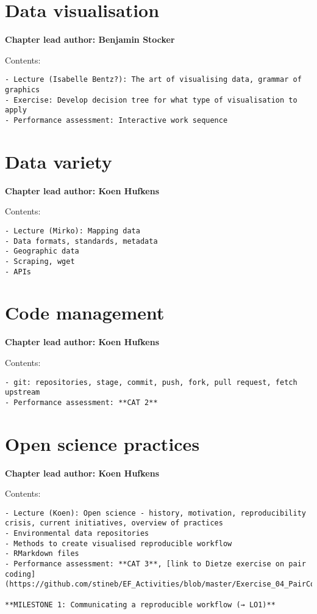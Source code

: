 \documentclass[
]{book}
\begin{document}
\hypertarget{data_vis}{%
\chapter{Data visualisation}\label{data_vis}}

\textbf{Chapter lead author: Benjamin Stocker}

Contents:

\begin{verbatim}
- Lecture (Isabelle Bentz?): The art of visualising data, grammar of graphics
- Exercise: Develop decision tree for what type of visualisation to apply
- Performance assessment: Interactive work sequence
\end{verbatim}

\hypertarget{data_variety}{%
\chapter{Data variety}\label{data_variety}}

\textbf{Chapter lead author: Koen Hufkens}

Contents:

\begin{verbatim}
- Lecture (Mirko): Mapping data
- Data formats, standards, metadata
- Geographic data
- Scraping, wget
- APIs
\end{verbatim}

\hypertarget{code_mgmt}{%
\chapter{Code management}\label{code_mgmt}}

\textbf{Chapter lead author: Koen Hufkens}

Contents:

\begin{verbatim}
- git: repositories, stage, commit, push, fork, pull request, fetch upstream
- Performance assessment: **CAT 2**
\end{verbatim}

\hypertarget{open_science}{%
\chapter{Open science practices}\label{open_science}}

\textbf{Chapter lead author: Koen Hufkens}

Contents:

\begin{verbatim}
- Lecture (Koen): Open science - history, motivation, reproducibility crisis, current initiatives, overview of practices
- Environmental data repositories
- Methods to create visualised reproducible workflow
- RMarkdown files
- Performance assessment: **CAT 3**, [link to Dietze exercise on pair coding](https://github.com/stineb/EF_Activities/blob/master/Exercise_04_PairCoding.Rmd)

**MILESTONE 1: Communicating a reproducible workflow (→ LO1)**
\end{verbatim}

  
\end{document}
